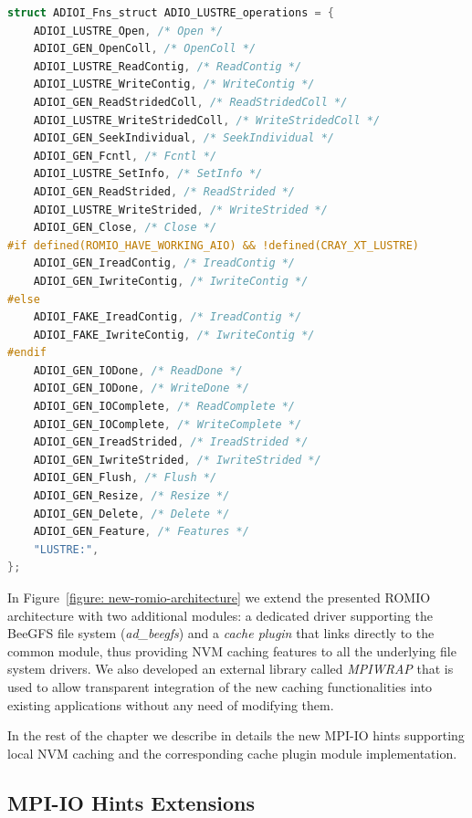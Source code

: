 \begin{lstlisting}[language=C, caption=Operation Table for Lustre Driver, label={list: lustre_table}]
struct ADIOI_Fns_struct ADIO_LUSTRE_operations = {
    ADIOI_LUSTRE_Open, /* Open */
    ADIOI_GEN_OpenColl, /* OpenColl */
    ADIOI_LUSTRE_ReadContig, /* ReadContig */
    ADIOI_LUSTRE_WriteContig, /* WriteContig */
    ADIOI_GEN_ReadStridedColl, /* ReadStridedColl */
    ADIOI_LUSTRE_WriteStridedColl, /* WriteStridedColl */
    ADIOI_GEN_SeekIndividual, /* SeekIndividual */
    ADIOI_GEN_Fcntl, /* Fcntl */
    ADIOI_LUSTRE_SetInfo, /* SetInfo */
    ADIOI_GEN_ReadStrided, /* ReadStrided */
    ADIOI_LUSTRE_WriteStrided, /* WriteStrided */
    ADIOI_GEN_Close, /* Close */
#if defined(ROMIO_HAVE_WORKING_AIO) && !defined(CRAY_XT_LUSTRE)
    ADIOI_GEN_IreadContig, /* IreadContig */
    ADIOI_GEN_IwriteContig, /* IwriteContig */
#else
    ADIOI_FAKE_IreadContig, /* IreadContig */
    ADIOI_FAKE_IwriteContig, /* IwriteContig */
#endif
    ADIOI_GEN_IODone, /* ReadDone */
    ADIOI_GEN_IODone, /* WriteDone */
    ADIOI_GEN_IOComplete, /* ReadComplete */
    ADIOI_GEN_IOComplete, /* WriteComplete */
    ADIOI_GEN_IreadStrided, /* IreadStrided */
    ADIOI_GEN_IwriteStrided, /* IwriteStrided */
    ADIOI_GEN_Flush, /* Flush */
    ADIOI_GEN_Resize, /* Resize */
    ADIOI_GEN_Delete, /* Delete */
    ADIOI_GEN_Feature, /* Features */
    "LUSTRE:",
};
\end{lstlisting}

In Figure~\ref{figure: new-romio-architecture} we extend the presented ROMIO architecture with two additional modules: a dedicated driver supporting the BeeGFS file system (\textit{ad\_beegfs}) and a \textit{cache plugin} that links directly to the common module, thus providing NVM caching features to all the underlying file system drivers. We also developed an external library called \textit{MPIWRAP} that is used to allow transparent integration of the new caching functionalities into existing applications without any need of modifying them. 

In the rest of the chapter we describe in details the new MPI-IO hints supporting local NVM caching and the corresponding cache plugin module implementation.

\subsection{MPI-IO Hints Extensions}

